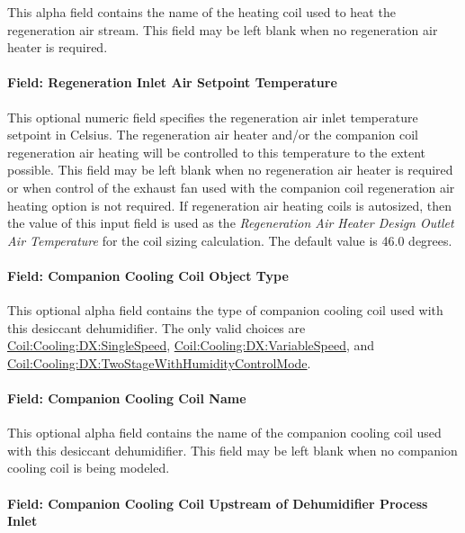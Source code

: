 This alpha field contains the name of the heating coil used to heat the regeneration air stream. This field may be left blank when no regeneration air heater is required.

\paragraph{Field: Regeneration Inlet Air Setpoint Temperature}\label{field-regeneration-inlet-air-setpoint-temperature}

This optional numeric field specifies the regeneration air inlet temperature setpoint in Celsius. The regeneration air heater and/or the companion coil regeneration air heating will be controlled to this temperature to the extent possible. This field may be left blank when no regeneration air heater is required or when control of the exhaust fan used with the companion coil regeneration air heating option is not required. If regeneration air heating coils is autosized, then the value of this input field is used as the \emph{Regeneration Air Heater Design Outlet Air Temperature} for the coil sizing calculation. The default value is 46.0 degrees.

\paragraph{Field: Companion Cooling Coil Object Type}\label{field-companion-cooling-coil-object-type}

This optional alpha field contains the type of companion cooling coil used with this desiccant dehumidifier. The only valid choices are \hyperref[coilcoolingdxsinglespeed]{Coil:Cooling:DX:SingleSpeed}, \hyperref[coilcoolingdxvariablespeed]{Coil:Cooling:DX:VariableSpeed}, and \hyperref[coilcoolingdxtwostagewithhumiditycontrolmode]{Coil:Cooling:DX:TwoStageWithHumidityControlMode}.

\paragraph{Field: Companion Cooling Coil Name}\label{field-companion-cooling-coil-name}

This optional alpha field contains the name of the companion cooling coil used with this desiccant dehumidifier. This field may be left blank when no companion cooling coil is being modeled.

\paragraph{Field: Companion Cooling Coil Upstream of Dehumidifier Process Inlet}\label{field-companion-cooling-coil-upstream-of-dehumidifier-process-inlet}

